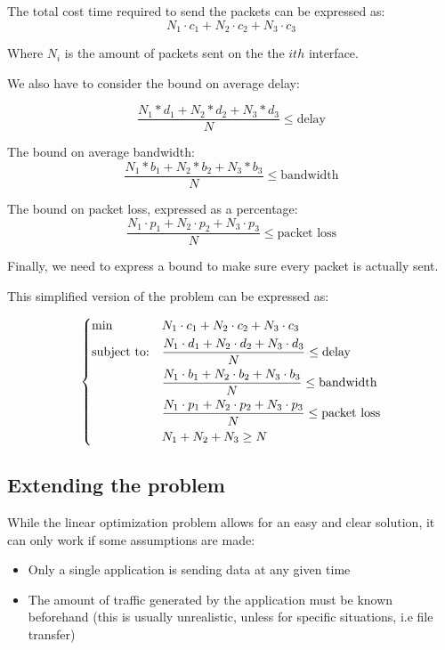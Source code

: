 \documentclass{report}
\begin{document}
The total cost time required to send the packets can be expressed as:
\[
	N_1 \cdot c_1 +
	N_2 \cdot c_2 +
	N_3 \cdot c_3 
\]

Where $N_i$ is the amount of packets sent on the the $ith$ interface.

We also have to consider the bound on average delay:

\[
	\frac
	{N_1 * d_1 + N_2 * d_2  + N_3 * d_3 }
	{N}
	 \le \text{delay}
\]

The bound on average bandwidth:
\[
\frac
{N_1 * b_1 + N_2 * b_2  + N_3 * b_3 }
{N}
\le \text{bandwidth}
\]

The bound on packet loss, expressed as a percentage:
\[
\frac
{N_1 \cdot p_1 + N_2 \cdot p_2 + N_3 \cdot p_3 }
{N}
\le \text{packet loss}
\]

Finally, we need to express a bound to make sure every packet is actually sent.

This simplified version of the problem can be expressed as: 

\begin{equation}\label{eq:linear_formulation_final}
	\begin{dcases}
		\begin{aligned}
			& {\text{min}}
			& & N_1 \cdot c_1 + N_2 \cdot c_2 +	N_3 \cdot c_3 \\
			& \text{subject to:}
			& & \frac
			{N_1 \cdot d_1 + N_2 \cdot d_2  + N_3 \cdot d_3 }
			{N}
			\le \text{delay} \\
			& & & \frac
			{N_1 \cdot b_1 + N_2 \cdot b_2  + N_3 \cdot b_3 }
			{N}
			\le \text{bandwidth} \\
			& & & \frac
			{N_1 \cdot p_1 + N_2 \cdot p_2 + N_3 \cdot p_3 }
			{N}
			\le \text{packet loss} \\
			& & &
			N_1 + N_2 + N_3 \ge N
		\end{aligned}
	\end{dcases}
\end{equation}



\subsection{Extending the problem}
While the linear optimization problem allows for an easy and clear solution, it can only work if some assumptions are made:

\begin{itemize}
	\item Only a single application is sending data at any given time
	\item The amount of traffic generated by the application must be known beforehand (this is usually unrealistic, unless for specific situations, i.e file transfer)
\end{itemize}
\end{document}
